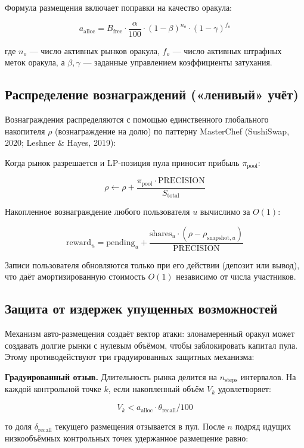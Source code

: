 \documentclass{ledger}
\theoremstyle{plain}
\theoremstyle{remark}
\begin{document}
Формула размещения включает поправки на качество оракула:

\[
a_{\text{alloc}} = B_{\text{free}} \cdot \frac{\alpha}{100} \cdot
(1 - \beta)^{n_o} \cdot (1 - \gamma)^{f_o}
\]

где $n_o$ --- число активных рынков оракула, $f_o$ --- число активных штрафных
меток оракула, а $\beta, \gamma$ --- заданные управлением коэффициенты затухания.

\subsection{Распределение вознаграждений («ленивый» учёт)}\label{sec:lazyacct}

Вознаграждения распределяются с помощью единственного глобального накопителя
$\rho$ (вознаграждение на долю) по паттерну MasterChef (SushiSwap, 2020; Leshner \&
Hayes, 2019):

Когда рынок разрешается и LP-позиция пула приносит прибыль $\pi_{\text{pool}}$:

\[
\rho \leftarrow \rho + \frac{\pi_{\text{pool}} \cdot \text{PRECISION}}{S_{\text{total}}}
\]

Накопленное вознаграждение любого пользователя $u$ вычислимо за $O(1)$:

\[
\text{reward}_u = \text{pending}_u + \frac{\text{shares}_u \cdot (\rho -
\rho_{\text{snapshot},u})}{\text{PRECISION}}
\]

Записи пользователя обновляются только при его действии (депозит или вывод), что
даёт амортизированную стоимость $O(1)$ независимо от числа участников.

\subsection{Защита от издержек упущенных возможностей}\label{sec:oppcost}

Механизм авто-размещения создаёт вектор атаки: злонамеренный оракул может создавать
долгие рынки с нулевым объёмом, чтобы заблокировать капитал пула. Этому
противодействуют три градуированных защитных механизма:

\textbf{Градуированный отзыв.} Длительность рынка делится на $n_{\text{steps}}$
интервалов. На каждой контрольной точке $k$, если накопленный объём $V_k$
удовлетворяет:

\[
V_k < a_{\text{alloc}} \cdot \theta_{\text{recall}} / 100
\]

то доля $\delta_{\text{recall}}$ текущего размещения отзывается в пул. После $n$
подряд идущих низкообъёмных контрольных точек удержанное размещение равно:
\end{document}
